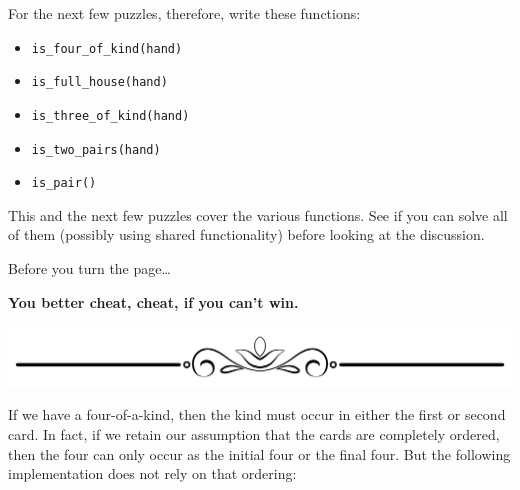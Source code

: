 For the next few puzzles, therefore, write these functions:

\begin{itemize}
\tightlist
\item
  \texttt{is\_four\_of\_kind(hand)}
\item
  \texttt{is\_full\_house(hand)}
\item
  \texttt{is\_three\_of\_kind(hand)}
\item
  \texttt{is\_two\_pairs(hand)}
\item
  \texttt{is\_pair()}
\end{itemize}

This and the next few puzzles cover the various functions. See if you
can solve all of them (possibly using shared functionality) before
looking at the discussion.

Before you turn the page\ldots{}

\textbf{You better cheat, cheat, if you can't win.}

\includegraphics{images/Elegant-Flourish-Frame-Extrapolated-19.svg}

\newpage

If we have a four-of-a-kind, then the kind must occur in either the
first or second card. In fact, if we retain our assumption that the
cards are completely ordered, then the four can only occur as the
initial four or the final four. But the following implementation does
not rely on that ordering:

